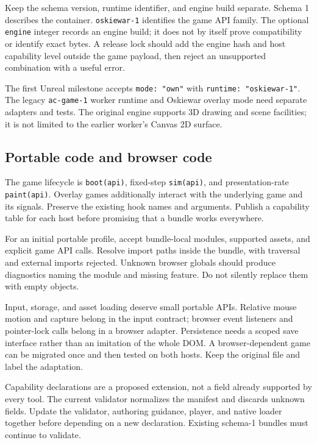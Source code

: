 \documentclass[10pt,letterpaper,twocolumn]{article}
\newcommand{\code}[1]{\texttt{\nolinkurl{#1}}}
\begin{document}
Keep the schema version, runtime identifier, and engine build separate. Schema 1 describes the container. \code{oskiewar-1} identifies the game API family. The optional \code{engine} integer records an engine build; it does not by itself prove compatibility or identify exact bytes. A release lock should add the engine hash and host capability level outside the game payload, then reject an unsupported combination with a useful error.

The first Unreal milestone accepts \code{mode: "own"} with \code{runtime: "oskiewar-1"}. The legacy \code{ac-game-1} worker runtime and Oskiewar overlay mode need separate adapters and tests. The original engine supports 3D drawing and scene facilities; it is not limited to the earlier worker's Canvas 2D surface.

\subsection{Portable code and browser code}
The game lifecycle is \code{boot(api)}, fixed-step \code{sim(api)}, and presentation-rate \code{paint(api)}. Overlay games additionally interact with the underlying game and its signals. Preserve the existing hook names and arguments. Publish a capability table for each host before promising that a bundle works everywhere.

For an initial portable profile, accept bundle-local modules, supported assets, and explicit game API calls. Resolve import paths inside the bundle, with traversal and external imports rejected. Unknown browser globals should produce diagnostics naming the module and missing feature. Do not silently replace them with empty objects.

Input, storage, and asset loading deserve small portable APIs. Relative mouse motion and capture belong in the input contract; browser event listeners and pointer-lock calls belong in a browser adapter. Persistence needs a scoped save interface rather than an imitation of the whole DOM. A browser-dependent game can be migrated once and then tested on both hosts. Keep the original file and label the adaptation.

Capability declarations are a proposed extension, not a field already supported by every tool. The current validator normalizes the manifest and discards unknown fields. Update the validator, authoring guidance, player, and native loader together before depending on a new declaration. Existing schema-1 bundles must continue to validate.
\end{document}
